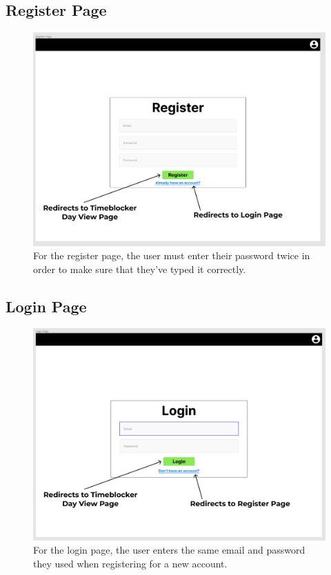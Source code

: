 \documentclass[12pt]{report}
\begin{document}
\subsection*{Register Page}
\begin{figure}[H]
	\caption{For the register page, the user must enter their password twice in order to make sure that they've typed it correctly.}
	\includegraphics[width=\textwidth]{register-page.png}
\end{figure}

\subsection*{Login Page}
\begin{figure}[H]
	\caption{For the login page, the user enters the same email and password they used when registering for a new account.}
	\includegraphics[width=\textwidth]{login-page.png}
\end{figure}
\end{document}

